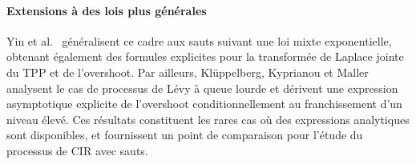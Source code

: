 \paragraph{Extensions à des lois plus générales}

Yin et al.~\cite{yin2014} généralisent ce cadre aux sauts suivant une loi mixte exponentielle, obtenant également des formules explicites pour la transformée de Laplace jointe du \acs{TPP} et de l'overshoot. Par ailleurs, Klüppelberg, Kyprianou et Maller~\cite{kluppelberg2004} analysent le cas de processus de Lévy à queue lourde et dérivent une expression asymptotique explicite de l'overshoot conditionnellement au franchissement d'un niveau élevé. Ces résultats constituent les rares cas où des expressions analytiques sont disponibles, et fournissent un point de comparaison pour l'étude du processus de \acs{CIR} avec sauts.
